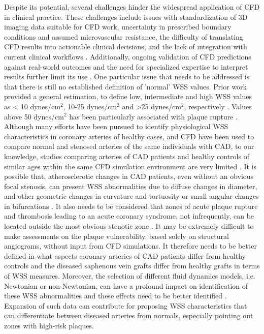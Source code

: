﻿\documentclass[12pt,a4paper]{article}
\theoremstyle{definition}
\numberwithin{equation}{section}
\begin{document}
Despite its potential, several challenges hinder the widespread application of CFD in clinical practice. These challenges include issues with standardization of 3D imaging data suitable for CFD work, uncertainty in prescribed boundary conditions and assumed microvascular resistance, the difficulty of translating CFD results into actionable clinical decisions, and the lack of integration with current clinical workflows \cite{57}. Additionally, ongoing validation of CFD predictions against real-world outcomes and the need for specialized expertise to interpret results further limit its use \cite{58}. One particular issue that needs to be addressed is that there is still no established definition of 'normal' WSS values. Prior work provided a general estimation, to define low, intermediate and high WSS values as < 10 dynes/cm$^{2}$, 10-25 dynes/cm$^{2}$ and >25 dynes/cm$^{2}$, respectively \cite{52, 59, 60}. Values above 50 dynes/cm$^{2}$ has been particularly associated with plaque rupture \cite{61, 62}. Although many efforts have been pursued to identify physiological WSS characteristics in coronary arteries of healthy cases, and CFD have been used to compare normal and stenosed arteries of the same individuals with CAD, to our knowledge, studies comparing arteries of  CAD patients and healthy controls of similar ages within the same CFD simulation environment are very limited \cite{55, 64, 65}. It is possible that, atherosclerotic changes in CAD patients, even without an obvious focal stenosis, can  present WSS abnormalities due to diffuse changes in diameter, and other geometric changes in curvature and tortuosity or small angular changes in bifurcations  \cite{55, 56}. It also needs to be considered that zones of acute plaque rupture and thrombosis leading to an acute coronary syndrome, not infrequently, can be located outside the most obvious stenotic zone \cite{66, 67}. It may be extremely difficult to make assessments on the plaque vulnerability, based solely on structural angiograms, without input from CFD simulations. It therefore needs to be better defined in what aspects coronary arteries of CAD patients differ from healthy controls and the diseased saphenous vein grafts differ from healthy grafts in terms of WSS measures. Moreover, the selection of different fluid dynamics models, i.e. Newtonian or non-Newtonian, can have a profound impact on identification of these WSS abnormalities and these effects need to be better identified \cite{7,8,9,10,11}. Expansion of such  data can contribute for proposing WSS characteristics that can differentiate between diseased arteries from normals, especially pointing out zones with high-risk plaques.
\end{document}
